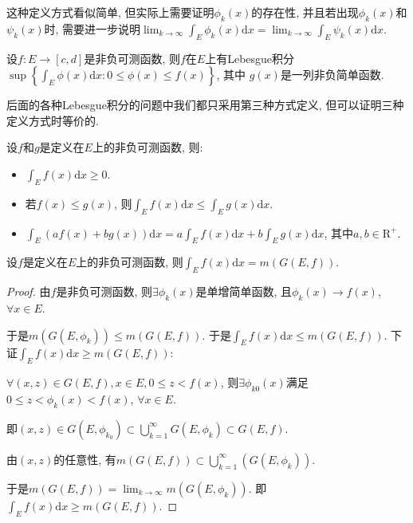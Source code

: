 \documentclass[theorem=false,mathfont=none,openany,sub3section]{easybook}
\begin{document}
这种定义方式看似简单, 但实际上需要证明$\phi_k(x)$的存在性, 并且若出现$\phi_k(x)$和$\psi_k(x)$时, 需要进一步说明$\lim_{k\to \infty}\int_{E}\phi_k(x)\mathrm{d}x=\lim_{k\to \infty}\int_{E}\psi _k(x)\mathrm{d}x$.\par

\begin{definition}
  设$f:E\rightarrow [c,d]$是非负可测函数, 则$f$在$E$上有Lebesgue积分$\sup\left\{\int_{E}\phi(x)\mathrm{d}x: 0\leqslant \phi(x) \leqslant f(x)\right\}$, 其中 $g(x)$是一列非负简单函数.\par
\end{definition}

后面的各种Lebesgue积分的问题中我们都只采用第三种方式定义, 但可以证明三种定义方式时等价的.\par

\begin{lemma}
  设$f$和$g$是定义在$E$上的非负可测函数, 则:\par
  \begin{itemize}
    \item $\int_{E}f(x)\mathrm{d}x\geqslant 0$.
    \item 若$f(x)\leqslant g(x)$, 则$\int_{E}f(x)\mathrm{d}x\leqslant \int_{E}g(x)\mathrm{d}x$.
    \item $\int_{E}(af(x)+bg(x))\mathrm{d}x=a\int_{E}f(x)\mathrm{d}x+b\int_{E}g(x)\mathrm{d}x$, 其中$a,b\in \mathrm{R}^{+}$.
  \end{itemize}
\end{lemma}

\begin{theorem}
  设$f$是定义在$E$上的非负可测函数, 则$\int_{E}f(x)\mathrm{d}x=m(G(E,f))$.\par
\end{theorem}

\begin{proof}
  由$f$是非负可测函数, 则$\exists \phi_k(x)$是单增简单函数, 且$\phi_k(x)\rightarrow f(x)$, $\forall x\in E$.\par
  于是$m(G(E,\phi_k))\leqslant m(G(E,f))$. 于是$\int_{E}f(x)\mathrm{d}x\leqslant m(G(E,f))$. 下证$\int_{E}f(x)\mathrm{d}x\geqslant m(G(E,f))$:\par
  $\forall (x,z)\in G(E,f), x \in E, 0\leqslant z<f(x)$, 则$\exists \phi_{k0}(x)$满足$0\leqslant z<\phi_k(x)<f(x)$, $\forall x\in E$.\par
  即$(x,z)\in G(E,\phi_{k_0})\subset \bigcup_{k=1}^{\infty}G(E,\phi_{k})\subset G(E,f)$.\par
  由$(x,z)$的任意性, 有$m(G(E,f))\subset \bigcup_{k=1}^{\infty}(G(E,\phi_k))$.\par
  于是$m(G(E,f))=\lim_{k\to \infty}m(G(E,\phi_k))$. 即$\int_{E}f(x)\mathrm{d}x\geqslant m(G(E,f))$.\par
\end{proof}
\end{document}
